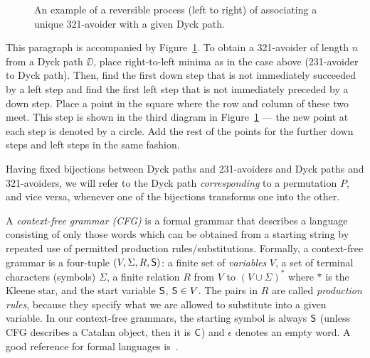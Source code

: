 \begin{figure}[!ht]
\begin{center}
\caption{\small{An example of a reversible process (left to right) of associating a unique 321-avoider with a given Dyck path.}}
\label{fig:bij321dyck}
\end{center}
\end{figure}

This paragraph is accompanied by Figure~\ref{fig:bij321dyck}. To obtain a 321-avoider of length $n$ from a Dyck path $\DD$, place right-to-left minima as in the case above (231-avoider to Dyck path). Then, find the first down step that is not immediately succeeded by a left step and find the first left step that is not immediately preceded by a down step. Place a point in the square where the row and column of these two meet. This step is shown in the third diagram in Figure~\ref{fig:bij321dyck} --- the new point at each step is denoted by a circle. Add the rest of the points for the further down steps and left steps in the same fashion.

Having fixed bijections between Dyck paths and 231-avoiders and Dyck paths and 321-avoiders, we will refer to the Dyck path \emph{corresponding} to a permutation $P$, and vice versa, whenever one of the bijections transforms one into the other.

A \emph{context-free grammar (CFG)} is a formal grammar that describes a language consisting of only those words which can be obtained from a starting string by repeated use of permitted production rules/substitutions. Formally, a context-free grammar is a four-tuple $(V, \Sigma, R, \mathsf{S} )$: a finite set of \emph{variables} $V$, a set of terminal characters (symbols) $\Sigma$, a finite relation $R$ from $V$ to $(V \cup \Sigma)^*$ where $*$ is the Kleene star, and the start variable $\mathsf{S}$, $\mathsf{S} \in V$. The pairs in $R$ are called \emph{production rules}, because they specify what we are allowed to substitute into a given variable. In our context-free grammars, the starting symbol is always $\mathsf{S}$ (unless CFG describes a Catalan object, then it is $\mathsf{C}$) and $\epsilon$ denotes an empty word. A good reference for formal languages is~\cite{hopcroft2001automata}.



